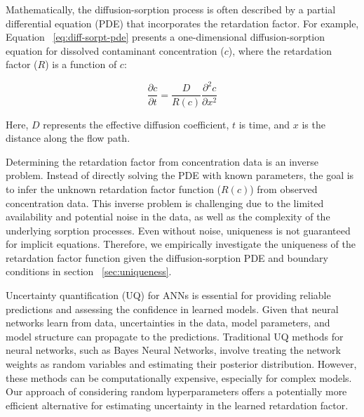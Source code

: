 Mathematically, the diffusion-sorption process is often described by a partial differential equation (PDE) that incorporates the retardation factor. For example, Equation ~\vref{eq:diff-sorpt-pde} presents a one-dimensional diffusion-sorption equation for dissolved contaminant concentration ($c$), where the retardation factor ($R$) is a function of $c$:

\begin{equation}
    \frac{\partial c}{\partial t} = \frac{D}{R(c)} \frac{\partial^2 c}{\partial x^2}
    \label{eq:diff-sorpt-pde}
\end{equation}

Here, $D$ represents the effective diffusion coefficient, $t$ is time, and $x$ is the distance along the flow path.

Determining the retardation factor from concentration data is an inverse problem. Instead of directly solving the PDE with known parameters, the goal is to infer the unknown retardation factor function ($R(c)$) from observed concentration data. This inverse problem is challenging due to the limited availability and potential noise in the data, as well as the complexity of the underlying sorption processes. Even without noise, uniqueness is not guaranteed for implicit equations. Therefore, we empirically investigate the uniqueness of the retardation factor function given the diffusion-sorption PDE and boundary conditions in section ~\vref{sec:uniqueness}.

Uncertainty quantification (UQ) for ANNs is essential for providing reliable predictions and assessing the confidence in learned models. Given that neural networks learn from data, uncertainties in the data, model parameters, and model structure can propagate to the predictions.
Traditional UQ methods for neural networks, such as Bayes Neural Networks, involve treating the network weights as random variables and estimating their posterior distribution. However, these methods can be computationally expensive, especially for complex models. Our approach of considering random hyperparameters offers a potentially more efficient alternative for estimating uncertainty in the learned retardation factor.



